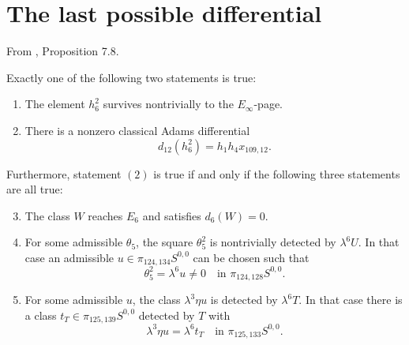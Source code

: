 \section{The last possible differential}

\begin{proposition}
\label{paper:7.8}
From \cite{LWX126}, Proposition 7.8.\par

\label{prop:possible_h_6_sq}\label{prop:possibleh62}
Exactly one of the following two statements is true:
\begin{enumerate}
    \item The element $h_6^2$ survives nontrivially to the $E_\infty$-page.

    \item There is a nonzero classical Adams differential
    $$d_{12}(h_6^2) = h_1h_4x_{109,12}.$$
\end{enumerate}
Furthermore, statement $(2)$ is true if and only if the following three statements are all true:
\begin{enumerate} \setcounter{enumi}{2}
    \item The class $W$ reaches $E_6$ and satisfies $d_6(W)=0$.

    \item For some admissible $\theta_5$, the square $\theta_5^2$ is
    nontrivially detected by $\lambda^6U$. In that case an admissible
    $u\in\pi_{124,134}S^{0,0}$ can be chosen such that
    \[
      \theta_5^2=\lambda^6u\ne0\quad\text{in }\pi_{124,128}S^{0,0}.
    \]

    \item For some admissible $u$, the class $\lambda^3\eta u$ is
    detected by $\lambda^6T$. In that case there is a class
    $t_T\in\pi_{125,139}S^{0,0}$ detected by $T$ with
    \[
      \lambda^3\eta u=\lambda^6t_T
        \quad\text{in }\pi_{125,133}S^{0,0}.
    \]
\end{enumerate}



\end{proposition}
